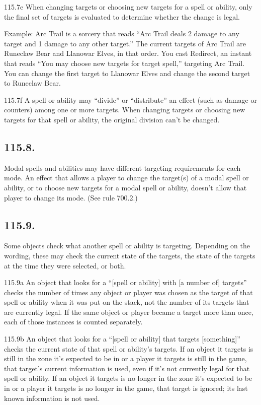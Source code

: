 115.7e When changing targets or choosing new targets for a spell or ability, only the final set of targets is evaluated to determine whether the change is legal.

Example: Arc Trail is a sorcery that reads “Arc Trail deals 2 damage to any target and 1 damage to any other target.” The current targets of Arc Trail are Runeclaw Bear and Llanowar Elves, in that order. You cast Redirect, an instant that reads “You may choose new targets for target spell,” targeting Arc Trail. You can change the first target to Llanowar Elves and change the second target to Runeclaw Bear.

115.7f A spell or ability may “divide” or “distribute” an effect (such as damage or counters) among one or more targets. When changing targets or choosing new targets for that spell or ability, the original division can’t be changed.

\subsection*{115.8.}
Modal spells and abilities may have different targeting requirements for each mode. An effect that allows a player to change the target(s) of a modal spell or ability, or to choose new targets for a modal spell or ability, doesn’t allow that player to change its mode. (See rule 700.2.)

\subsection*{115.9.}
Some objects check what another spell or ability is targeting. Depending on the wording, these may check the current state of the targets, the state of the targets at the time they were selected, or both.

115.9a An object that looks for a “[spell or ability] with [a number of] targets” checks the number of times any object or player was chosen as the target of that spell or ability when it was put on the stack, not the number of its targets that are currently legal. If the same object or player became a target more than once, each of those instances is counted separately.

115.9b An object that looks for a “[spell or ability] that targets [something]” checks the current state of that spell or ability’s targets. If an object it targets is still in the zone it’s expected to be in or a player it targets is still in the game, that target’s current information is used, even if it’s not currently legal for that spell or ability. If an object it targets is no longer in the zone it’s expected to be in or a player it targets is no longer in the game, that target is ignored; its last known information is not used.

